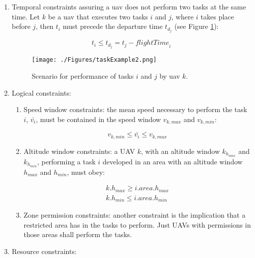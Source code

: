 \begin{enumerate}

\item Temporal constraints assuring a \gls{uav} does not perform two tasks at the same time. Let $k$ be a \gls{uav} that executes two tasks $i$ and $j$, where $i$ takes place before $j$, then $t_i$ must precede the departure time $t_{d_j}$ (see Figure \ref{fig:assignment2}):

\begin{equation}\label{eq:temporalConstraint}
  t_i \leqslant t_{d_j} = t_j - {flightTime}_i
\end{equation}

	\begin{figure}[!h]
		\texttt{[image: ./Figures/taskExample2.png]}
		\centering
		\caption{Scenario for performance of tasks $i$ and $j$ by \gls{uav} $k$.}
		\label{fig:assignment2}
	\end{figure}

\item Logical constraints:

\begin{enumerate}

\item Speed window constraints: the mean speed necessary to perform the task $i$, $\bar{v_i}$, must be contained in the speed window $v_{k,max}$ and $v_{k,min}$:

\begin{equation}
  v_{k,min} \leq \bar{v_i} \leq v_{k,max}
\end{equation}

\item Altitude window constraints: a UAV $k$, with an altitude window $k_{h_{max}}$ and $k_{h_{min}}$, performing a task $i$ developed in an area with an altitude window $h_{max}$ and $h_{min}$, must obey:

\begin{align}
  k.h_{max} \geq i.area.h_{max} \\
  k.h_{min} \leq i.area.h_{min}
\end{align}

\item Zone permission constraints: another constraint is the implication that a restricted area has in the tasks to perform. Just UAVs with permissions in those areas shall perform the tasks.

\end{enumerate}

\item Resource constraints:


\end{enumerate}
